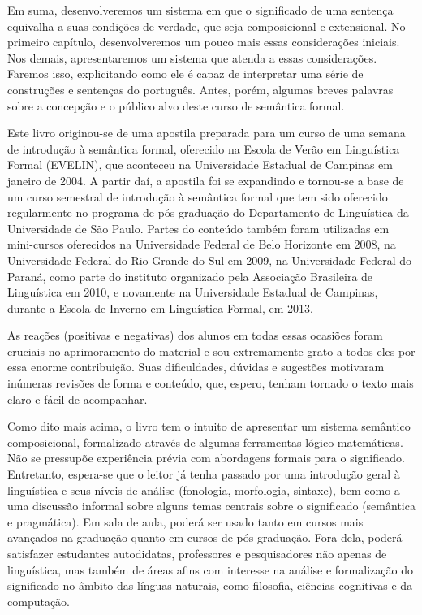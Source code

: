 \begin{refsection}
Em suma, desenvolveremos um sistema em que o significado de uma sentença equivalha a suas condições de verdade, que seja composicional e extensional. No primeiro capítulo, desenvolveremos um pouco mais essas considerações iniciais. Nos demais, apresentaremos um sistema que atenda a essas considerações. Faremos isso, explicitando como ele é capaz de interpretar uma série de construções e sentenças do português. Antes, porém, algumas breves palavras sobre a concepção e o público alvo deste curso de semântica formal.

Este livro originou-se de uma apostila preparada para um curso de uma semana de introdução à semântica formal, oferecido na Escola de Verão em Linguística Formal (EVELIN), que aconteceu na Universidade Estadual de Campinas em janeiro de 2004. A partir daí, a apostila foi se expandindo e tornou-se a base de um curso semestral de introdução à semântica formal que tem sido oferecido regularmente no programa de pós-graduação do Departamento de Linguística da Universidade de São Paulo. Partes do conteúdo também foram utilizadas em mini-cursos oferecidos na Universidade Federal de Belo Horizonte em 2008, na Universidade Federal do Rio Grande do Sul em 2009, na Universidade Federal do Paraná, como parte do instituto organizado pela Associação Brasileira de Linguística em 2010, e novamente na Universidade Estadual de Campinas, durante a Escola de Inverno em Linguística Formal, em 2013. 

As reações (positivas e negativas) dos alunos em todas essas ocasiões foram cruciais no aprimoramento do material e sou extremamente grato a todos eles por essa enorme contribuição. Suas dificuldades, dúvidas e sugestões motivaram inúmeras revisões de forma e conteúdo, que, espero, tenham tornado o texto mais claro e fácil de acompanhar.

Como dito mais acima, o livro tem o intuito de apresentar um sistema semântico composicional, formalizado através de algumas ferramentas ló\-gi\-co-ma\-te\-má\-ti\-cas. Não se pressupõe experiência prévia com abordagens formais para o significado. Entretanto, espera-se que o leitor já tenha passado por uma introdução geral à linguística e seus níveis de análise (fonologia, morfologia, sintaxe), bem como a uma discussão informal sobre alguns temas centrais sobre o significado (semântica e pragmática). Em sala de aula, poderá ser usado tanto em cursos mais avançados na graduação quanto em cursos de pós-graduação. Fora dela, poderá satisfazer estudantes autodidatas, professores e pesquisadores não apenas de linguística, mas também de áreas afins com interesse na análise e formalização do significado no âmbito das línguas naturais, como filosofia, ciências cognitivas e da computação.


\end{refsection}
